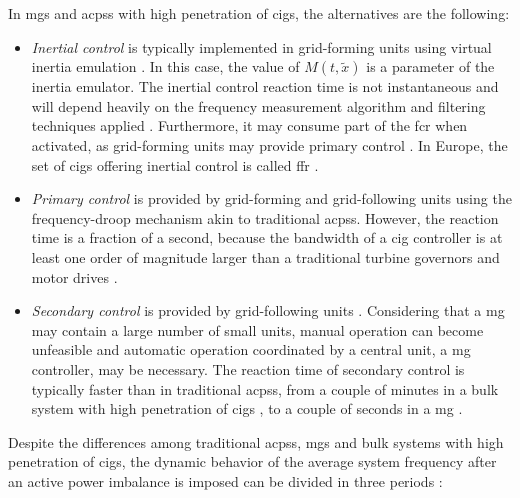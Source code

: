 \documentclass[utf8]{frontiersSCNS} %
\begin{document}
In \glspl{mg} and \glspl{acps} with high penetration of \glspl{cig}, the alternatives are the following: 

\begin{itemize}%
    \item \textit{Inertial control} is typically implemented in grid-forming units \citep{vandoornMicrogridsHierarchicalControl2013} using virtual inertia emulation \citep{darcoVirtualSynchronousMachines2013, fangInertiaFutureMoreElectronics2019}. In this case, the value of $ M(t, \widetilde{x}) $ is a parameter of the inertia emulator. The inertial control reaction time is not instantaneous and will depend heavily on the frequency measurement algorithm and filtering techniques applied \citep{marchgraberComparisonControlStrategies2020}. Furthermore, it may consume part of the \gls{fcr} when activated, as grid-forming units may provide primary control \citep{entso-eFastFrequencyReserve2019}. In Europe, the set of \glspl{cig} offering inertial control is called \gls{ffr}  \citep{entso-eFastFrequencyReserve2019}.
    
    \item \textit{Primary control} is provided by grid-forming and grid-following units using the frequency-droop mechanism \citep{vandoornMicrogridsHierarchicalControl2013} akin to traditional \glspl{acps}. However, the reaction time is a fraction of a second, because the bandwidth of a \gls{cig} controller is at least one order of magnitude larger than a traditional turbine governors and motor drives \citep{fangInertiaFutureMoreElectronics2019}.
    
    \item \textit{Secondary control} is provided by grid-following units \citep{vandoornMicrogridsHierarchicalControl2013}. Considering that a \gls{mg} may contain a large number of small units, manual operation can become unfeasible and automatic operation coordinated by a central unit, a \gls{mg} controller, may be necessary. The reaction time of secondary control is typically faster than in traditional \glspl{acps}, from a couple of minutes in a bulk system with high penetration of \glspl{cig} \citep{entso-eFastFrequencyReserve2019}, to a couple of seconds in a \gls{mg} \citep{dossantosalonsoConsiderationsCommunicationInfrastructures2019,brandaoCoordinatedControlDistributed2019}.
\end{itemize}

Despite the differences among traditional \glspl{acps}, \glspl{mg} and bulk systems with high penetration of \glspl{cig}, the dynamic behavior of the average system frequency after an active power imbalance is imposed can be divided in three periods \citep{etoFrequencyControlRequirements2018}:
\end{document}
